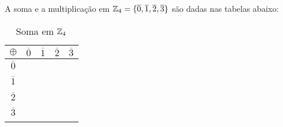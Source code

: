 \documentclass{beamer}
\begin{document}
    \begin{frame}
        \begin{exemplo}
            A soma e a multiplica{\c c}{\~a}o em $\mathbb{Z}_4 = \{\overline{0},\overline{1},\overline{2},\overline{3}\}$ \pause
            s\~ao dadas nas tabelas abaixo:\pause
                \begin{table}[!htb]
                  \caption{Soma em $\mathbb{Z}_4$}
                  \hskip-6.0cm
                    \begin{tabular}{|c|c|c|c|c|} 
                        \hline
                        $\oplus$ & $\overline{0}$ & $\overline{1}$ & $\overline{2}$ & $\overline{3}$\T\\
                        \hline
                        $\overline{0}$ & \phantom{abc} & \phantom{abc} & \phantom{abc} & \phantom{abc}\T\\
                        & & & &\\
                        \hline
                        $\overline{1}$ & \phantom{abc} & \phantom{abc}& \phantom{abc} & \phantom{abc}\T\\
                        & & & &\\
                        \hline
                        $\overline{2}$ & \phantom{abc} & \phantom{abc} & \phantom{abc} & \phantom{abc}\T\\
                        & & & &\\
                        \hline
                        $\overline{3}$ & \phantom{abc} & \phantom{abc} & \phantom{abc} & \phantom{abc}\T\\
                        & & & &\\
                        \hline
                    \end{tabular}
                \end{table}
                \vspace{2cm}
        \end{exemplo}
    \end{frame}
\end{document}
